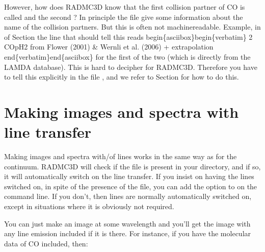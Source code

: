 \documentclass[letterpaper,10pt,english]{sphinxmanual}
\begin{document}
However, how does RADMC\sphinxhyphen{}3D know that the first collision partner of CO is called
 and the second ?  In principle the file 
give some information about the name of the collision partners. But this is
often not machine\sphinxhyphen{}readable.  Example, in  of Section
{\hyperref[\detokenize{lineradtrans:sec-molecule-xxx-inp}]{}} the line that should tell this reads
begin\{asciibox\}begin\{verbatim\} 2 CO\sphinxhyphen{}pH2 from Flower (2001) \& Wernli et
al. (2006) + extrapolation end\{verbatim\}end\{asciibox\} for the first of the two
(which is directly from the LAMDA database).  This is hard to decipher for
RADMC\sphinxhyphen{}3D. Therefore you have to tell this explicitly in the file ,
and we refer to Section {\hyperref[\detokenize{lineradtrans:sec-line-dot-inp}]{}} for how to do this.


\section{Making images and spectra with line transfer}
\label{\detokenize{lineradtrans:making-images-and-spectra-with-line-transfer}}
Making images and spectra with/of lines works in the same way as for the
continuum. RADMC\sphinxhyphen{}3D will check if the file  is present in your
directory, and if so, it will automatically switch on the line transfer. If you
insist on  having the lines switched on, in spite of the presence of the
 file, you can add the option  to  on the
command line. If you don’t, then lines are normally automatically switched on,
except in situations where it is obviously not required.

You can just make an image at some wavelength and you’ll get the image with
any line emission included if it is there. For instance, if you have
the molecular data of CO included, then:

\begin{sphinxVerbatim}[commandchars=\\\{\}]
   
\end{sphinxVerbatim}
\end{document}
